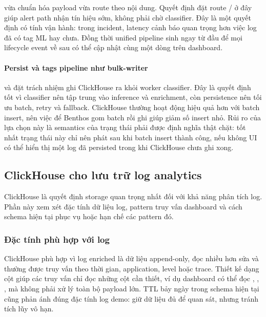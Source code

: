  vừa chuẩn hóa payload vừa route theo nội dung. Quyết định đặt route / ở đây giúp alert path nhận tín hiệu sớm, không phải chờ classifier. Đây là một quyết định có tính vận hành: trong incident, latency cảnh báo quan trọng hơn việc log đã có tag ML hay chưa. Đồng thời unified pipeline sinh  ngay từ đầu để mọi lifecycle event về sau có thể cập nhật cùng một dòng trên dashboard.

\paragraph{Persist và tags pipeline như bulk-writer}

 và  đặt trách nhiệm ghi ClickHouse ra khỏi worker classifier. Đây là quyết định tốt vì classifier nên tập trung vào inference và enrichment, còn persistence nên tối ưu batch, retry và fallback. ClickHouse thường hoạt động hiệu quả hơn với batch insert, nên việc để Benthos gom batch rồi ghi  giúp giảm số insert nhỏ. Rủi ro của lựa chọn này là semantics của trạng thái  phải được định nghĩa thật chặt: tốt nhất trạng thái này chỉ nên phát sau khi batch insert thành công, nếu không UI có thể hiển thị một log đã persisted trong khi ClickHouse chưa ghi xong.

\subsection{ClickHouse cho lưu trữ log analytics}

ClickHouse là quyết định storage quan trọng nhất đối với khả năng phân tích log. Phần này xem xét đặc tính dữ liệu log, pattern truy vấn dashboard và cách schema hiện tại phục vụ hoặc hạn chế các pattern đó.

\subsubsection{Đặc tính phù hợp với log}

ClickHouse phù hợp vì log enriched là dữ liệu append-only, đọc nhiều hơn sửa và thường được truy vấn theo thời gian, application, level hoặc trace. Thiết kế dạng cột giúp các truy vấn chỉ đọc những cột cần thiết, ví dụ dashboard có thể đọc , , ,  mà không phải xử lý toàn bộ payload lớn. TTL bảy ngày trong schema hiện tại cũng phản ánh đúng đặc tính log demo: giữ dữ liệu đủ để quan sát, nhưng tránh tích lũy vô hạn.

